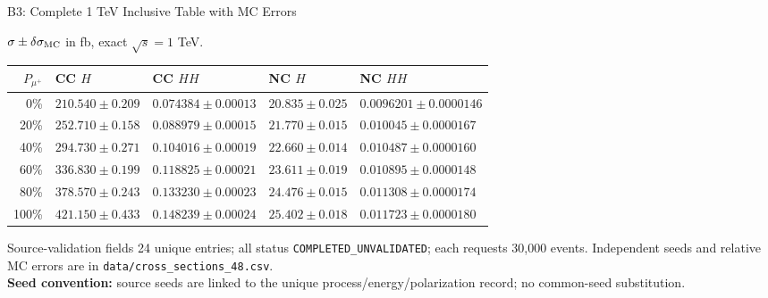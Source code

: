 \documentclass[aspectratio=1610,english]{beamer}
\newcommand{\src}[1]{\vfill{\par\color{black!65}\fontsize{6.4}{7.4}\selectfont\emph{Source:} #1\par}}
\begin{document}
\begin{frame}[t]{B3: Complete 1 TeV Inclusive Table with MC Errors}
\scriptsize

\begin{center}\scriptsize $\sigma\pm\delta\sigma_{\rm MC}$ in fb, exact $\sqrt{s}=1$ TeV.\end{center}
\begin{center}\setlength{\tabcolsep}{3pt}\renewcommand{\arraystretch}{1.23}\begin{tabular}{rllll}\toprule $P_{\mu^+}$ & CC $H$ & CC $HH$ & NC $H$ & NC $HH$ \\ \midrule
0\% & $210.540\pm0.209$ & $0.074384\pm0.00013$ & $20.835\pm0.025$ & $0.0096201\pm0.0000146$ \\
20\% & $252.710\pm0.158$ & $0.088979\pm0.00015$ & $21.770\pm0.015$ & $0.010045\pm0.0000167$ \\
40\% & $294.730\pm0.271$ & $0.104016\pm0.00019$ & $22.660\pm0.014$ & $0.010487\pm0.0000160$ \\
60\% & $336.830\pm0.199$ & $0.118825\pm0.00021$ & $23.611\pm0.019$ & $0.010895\pm0.0000148$ \\
80\% & $378.570\pm0.243$ & $0.133230\pm0.00023$ & $24.476\pm0.015$ & $0.011308\pm0.0000174$ \\
100\% & $421.150\pm0.433$ & $0.148239\pm0.00024$ & $25.402\pm0.018$ & $0.011723\pm0.0000180$ \\
\bottomrule\end{tabular}\end{center}
\vspace{-.4em}\begin{block}{Source-validation fields}\scriptsize
24 unique entries; all status \texttt{COMPLETED\_UNVALIDATED}; each requests 30,000 events. Independent seeds and relative MC errors are in \texttt{data/cross\_sections\_48.csv}.\\[.15em]
\textbf{Seed convention:} source seeds are linked to the unique process/energy/polarization record; no common-seed substitution.
\end{block}

\end{frame}
\end{document}
